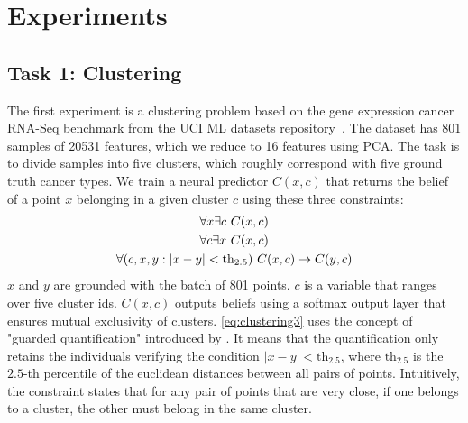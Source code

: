 \documentclass{article}
\theoremstyle{definition}
\begin{document}


\section{Experiments}
\label{s:experiments}
\def\StableRL{LTN-Stable\ }
\def\ProdRL{LTN-Prod\ }
\def\logLTNsum{\logLTN-sum\ }
\def\logLTNmax{\logLTN-max\ }
\def\logLTNLSE{\logLTN-LSE\ }

\subsection{Task 1: Clustering}
\label{s:task_clustering}
The first experiment is a clustering problem based on the gene expression cancer RNA-Seq benchmark from the UCI ML datasets repository~\cite{UCI_Dua_2019}. 
The dataset has 801 samples of 20531 features, which we reduce to 16 features using PCA. 
The task is to divide samples into five clusters, which roughly correspond with five ground truth cancer types. 
We train a neural predictor $C(x,c)$ that returns the belief of a point $x$ belonging in a given cluster $c$ using these three constraints:
\begin{gather}
\label{eq:clustering1}    \forall x \exists c\ C(x,c)\\
\label{eq:clustering2}    \forall c \exists x\ C(x,c)\\
\label{eq:clustering3}    \forall (c,x,y: \lvert x-y \rvert < \mathrm{th}_{2.5})\ C(x,c) \rightarrow C(y,c) 
\end{gather} 
$x$ and $y$ are grounded with the batch of 801 points.
$c$ is a variable that ranges over five cluster ids.
$C(x,c)$ outputs beliefs using a softmax output layer that ensures mutual exclusivity of clusters.
\eqref{eq:clustering3} uses the concept of "guarded quantification" introduced by \cite{badreddine_logic_2022}.
It means that the quantification only retains the individuals verifying the condition $\lvert x-y \rvert < \mathrm{th}_{2.5}$,
where $\mathrm{th}_{2.5}$ is the $2.5$-th percentile of the euclidean distances between all pairs of points.
Intuitively, the constraint states that for any pair of points that are very close, if one belongs to a cluster, the other must belong in the same cluster.
\end{document}
